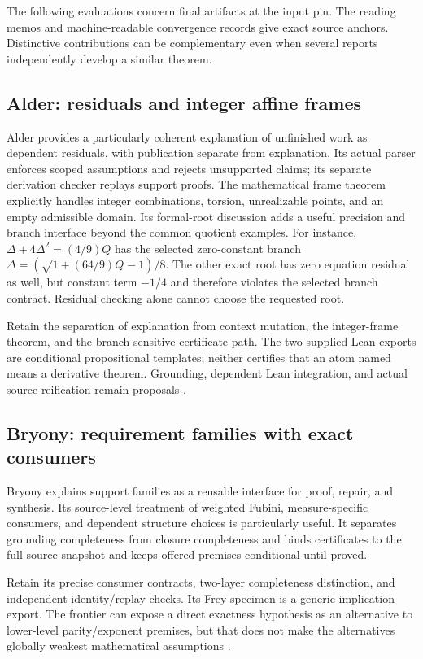 \documentclass[11pt,letterpaper]{article}
\newcommand{\code}[1]{\texttt{\detokenize{#1}}}
\theoremstyle{definition}\newtheorem{definition}[proposition]{Definition}
\theoremstyle{remark}\newtheorem{remark}[proposition]{Remark}
\begin{document}
The following evaluations concern final artifacts at the input pin. The
reading memos and machine-readable convergence records give exact source
anchors. Distinctive contributions can be complementary even when several
reports independently develop a similar theorem.

\subsection{Alder: residuals and integer affine frames}

Alder provides a particularly coherent explanation of unfinished work as
dependent residuals, with publication separate from explanation. Its actual
parser enforces scoped assumptions and rejects unsupported claims; its
separate derivation checker replays support proofs. The mathematical frame
theorem explicitly handles integer combinations, torsion, unrealizable points,
and an empty admissible domain. Its formal-root discussion adds a useful
precision and branch interface beyond the common quotient examples. For
instance, $\Delta+4\Delta^2=(4/9)Q$ has the selected zero-constant branch
$\Delta=(\sqrt{1+(64/9)Q}-1)/8$. The other exact root has zero equation
residual as well, but constant term $-1/4$ and therefore violates the selected
branch contract. Residual checking alone cannot choose the requested root.

Retain the separation of explanation from context mutation, the integer-frame
theorem, and the branch-sensitive certificate path. The two supplied Lean
exports are conditional propositional templates; neither certifies that an
atom named \code{derivative_eq} means a derivative theorem. Grounding,
dependent Lean integration, and actual source reification remain proposals
\cite{alder}.

\subsection{Bryony: requirement families with exact consumers}

Bryony explains support families as a reusable interface for proof, repair,
and synthesis. Its source-level treatment of weighted Fubini, measure-specific
consumers, and dependent structure choices is particularly useful. It separates
grounding completeness from closure completeness and binds certificates to the full source snapshot and keeps offered
premises conditional until proved.

Retain its precise consumer contracts, two-layer completeness distinction,
and independent identity/replay checks. Its Frey specimen is a generic
implication export. The frontier can expose a direct exactness hypothesis
as an alternative to lower-level parity/exponent premises, but that does
not make the alternatives globally weakest mathematical assumptions
\cite{bryony}.
\end{document}
